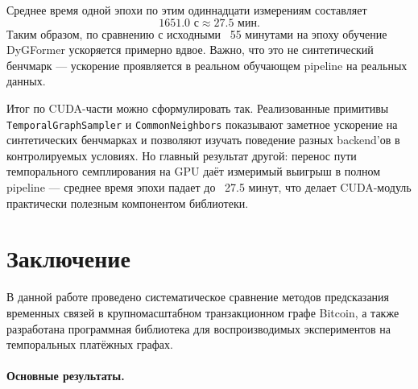 \documentclass[a4paper,12pt]{extarticle}
\begin{document}
  Среднее время одной эпохи по этим одиннадцати измерениям составляет
  \[
  1651.0 \text{ с} \approx 27.5 \text{ мин}.
  \]
  Таким образом, по сравнению с исходными ~55 минутами на эпоху обучение DyGFormer ускоряется примерно вдвое. Важно, что это не синтетический бенчмарк --- ускорение проявляется в реальном обучающем pipeline на реальных данных.

Итог по CUDA-части можно сформулировать так. Реализованные примитивы \\ \texttt{TemporalGraphSampler} и \texttt{CommonNeighbors} показывают заметное ускорение на синтетических бенчмарках и позволяют изучать поведение разных backend'ов в контролируемых условиях. Но главный результат другой: перенос пути темпорального семплирования на GPU даёт измеримый выигрыш в полном pipeline --- среднее время эпохи падает до ~27.5 минут, что делает CUDA-модуль практически полезным компонентом библиотеки.

\newpage

\section*{Заключение}


В данной работе проведено систематическое сравнение методов предсказания временных связей в крупномасштабном транзакционном графе Bitcoin, а также разработана программная библиотека для воспроизводимых экспериментов на темпоральных платёжных графах.

\paragraph{Основные результаты.}
\end{document}
